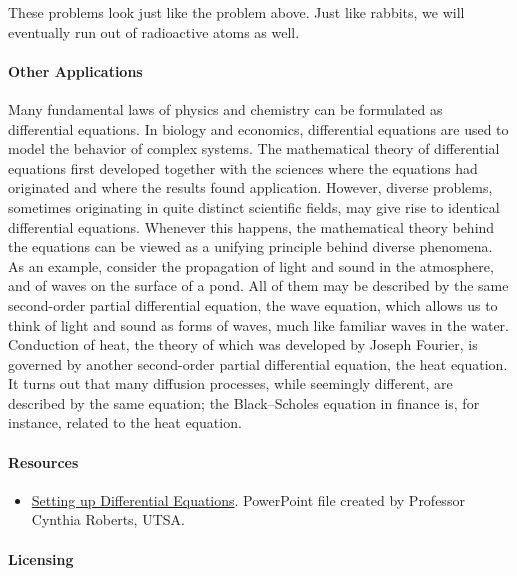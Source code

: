 These problems look just like the problem above. Just like rabbits, we will eventually run out of radioactive atoms as well.

\paragraph{Other Applications}

Many fundamental laws of physics and chemistry can be formulated as differential equations. In biology and economics, differential equations are used to model the behavior of complex systems. The mathematical theory of differential equations first developed together with the sciences where the equations had originated and where the results found application. However, diverse problems, sometimes originating in quite distinct scientific fields, may give rise to identical differential equations. Whenever this happens, the mathematical theory behind the equations can be viewed as a unifying principle behind diverse phenomena. As an example, consider the propagation of light and sound in the atmosphere, and of waves on the surface of a pond. All of them may be described by the same second-order partial differential equation, the wave equation, which allows us to think of light and sound as forms of waves, much like familiar waves in the water. Conduction of heat, the theory of which was developed by Joseph Fourier, is governed by another second-order partial differential equation, the heat equation. It turns out that many diffusion processes, while seemingly different, are described by the same equation; the Black–Scholes equation in finance is, for instance, related to the heat equation.

\paragraph{Resources}

\begin{itemize}
    \item \href{https://mathresearch.utsa.edu/wikiFiles/MAT1193/Differential\%20Equations\%20(Mathematical\%20Modeling)/Presentation17_Setting\%20Up\%20Differential\%20Equations.pptx}{Setting up Differential Equations}. PowerPoint file created by Professor Cynthia Roberts, UTSA.
\end{itemize}

\paragraph{Licensing}

